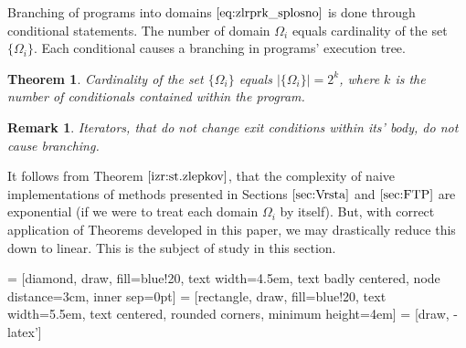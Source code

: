 \documentclass{article}
\newtheorem{izrek}{Theorem}[section]
\newtheorem{opomba}{Remark}[section]
\begin{document}
Branching of programs into domains $\eqref{eq:zlrprk_splosno}$ is done through conditional statements. The number of domain $\Omega_i$ equals cardinality of the set $\{\Omega_i\}$. Each conditional causes a branching in programs' execution tree.

\begin{izrek}\label{izr:st.zlepkov}
Cardinality of the set $\{\Omega_i\}$ equals $\lvert\{\Omega_i \}\rvert=2^k$, where $k$ is the number of conditionals contained within the program.
\end{izrek}
\begin{opomba}
Iterators, that do not change exit conditions within its' body, do not cause branching.
\end{opomba}

It follows from Theorem $\ref{izr:st.zlepkov}$, that the complexity of naive implementations of methods presented in Sections $\ref{sec:Vrsta}$ and $\ref{sec:FTP}$ are exponential (if we were to treat each domain $\Omega_i$ by itself). But, with correct application of Theorems developed in this paper, we may drastically reduce this down to linear. This is the subject of study in this section.
\vspace{10px}

 = [diamond, draw, fill=blue!20, 
    text width=4.5em, text badly centered, node distance=3cm, inner sep=0pt]
 = [rectangle, draw, fill=blue!20, 
    text width=5.5em, text centered, rounded corners, minimum height=4em]
 = [draw, -latex']
\end{document}
